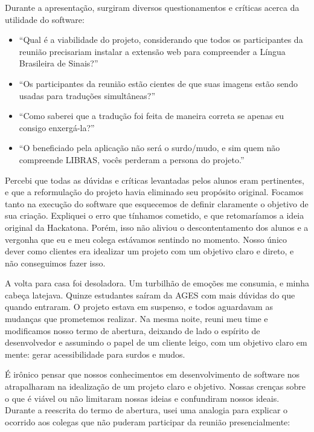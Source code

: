 \originaltab{}Durante a apresentação, surgiram diversos questionamentos e críticas acerca da utilidade do software:\par

\begin{itemize}
\item “Qual é a viabilidade do projeto, considerando que todos os participantes da reunião precisariam instalar a extensão web para compreender a Língua Brasileira de Sinais?”
\item “Os participantes da reunião estão cientes de que suas imagens estão sendo usadas para traduções simultâneas?”
\item “Como saberei que a tradução foi feita de maneira correta se apenas eu consigo enxergá-la?”
\item “O beneficiado pela aplicação não será o surdo/mudo, e sim quem não compreende LIBRAS, vocês perderam a persona do projeto.”
\end{itemize}

\originaltab{}Percebi que todas as dúvidas e críticas levantadas pelos alunos eram pertinentes, e que a reformulação do projeto havia eliminado seu propósito original. Focamos tanto na execução do software que esquecemos de definir claramente o objetivo de sua criação. Expliquei o erro que tínhamos cometido, e que retomaríamos a ideia original da Hackatona. Porém, isso não aliviou o descontentamento dos alunos e a vergonha que eu e meu colega estávamos sentindo no momento. Nosso único dever como clientes era idealizar um projeto com um objetivo claro e direto, e não conseguimos fazer isso.\par

\originaltab{}A volta para casa foi desoladora. Um turbilhão de emoções me consumia, e minha cabeça latejava. Quinze estudantes saíram da AGES com mais dúvidas do que quando entraram. O projeto estava em suspenso, e todos aguardavam as mudanças que prometemos realizar. Na mesma noite, reuni meu time e modificamos nosso termo de abertura, deixando de lado o espírito de desenvolvedor e assumindo o papel de um cliente leigo, com um objetivo claro em mente: gerar acessibilidade para surdos e mudos.\par

\originaltab{}É irônico pensar que nossos conhecimentos em desenvolvimento de software nos atrapalharam na idealização de um projeto claro e objetivo. Nossas crenças sobre o que é viável ou não limitaram nossas ideias e confundiram nossos ideais. Durante a reescrita do termo de abertura, usei uma analogia para explicar o ocorrido aos colegas que não puderam participar da reunião presencialmente:\par

